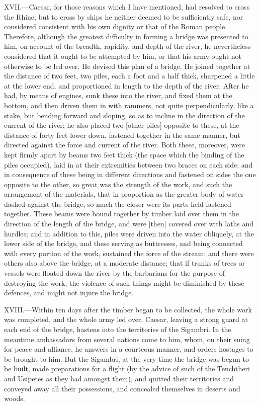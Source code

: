 XVII.—Caesar, for those reasons which I have mentioned, had resolved to
cross the Rhine; but to cross by ships he neither deemed to be
sufficiently safe, nor considered consistent with his own dignity or
that of the Roman people. Therefore, although the greatest difficulty in
forming a bridge was presented to him, on account of the breadth,
rapidity, and depth of the river, he nevertheless considered that it
ought to be attempted by him, or that his army ought not otherwise to be
led over. He devised this plan of a bridge. He joined together at the
distance of two feet, two piles, each a foot and a half thick, sharpened
a little at the lower end, and proportioned in length to the depth of
the river. After he had, by means of engines, sunk these into the river,
and fixed them at the bottom, and then driven them in with rammers, not
quite perpendicularly, like a stake, but bending forward and sloping, so
as to incline in the direction of the current of the river; he also
placed two [other piles] opposite to these, at the distance of forty
feet lower down, fastened together in the same manner, but directed
against the force and current of the river. Both these, moreover, were
kept firmly apart by beams two feet thick (the space which the binding
of the piles occupied), laid in at their extremities between two braces
on each side; and in consequence of these being in different directions
and fastened on sides the one opposite to the other, so great was the
strength of the work, and such the arrangement of the materials, that in
proportion as the greater body of water dashed against the bridge, so
much the closer were its parts held fastened together. These beams were
bound together by timber laid over them in the direction of the length
of the bridge, and were [then] covered over with laths and hurdles; and
in addition to this, piles were driven into the water obliquely, at the
lower side of the bridge, and these serving as buttresses, and being
connected with every portion of the work, sustained the force of the
stream: and there were others also above the bridge, at a moderate
distance; that if trunks of trees or vessels were floated down the river
by the barbarians for the purpose of destroying the work, the violence
of such things might be diminished by these defences, and might not
injure the bridge.

XVIII.—Within ten days after the timber began to be collected, the
whole work was completed, and the whole army led over. Caesar, leaving a
strong guard at each end of the bridge, hastens into the territories of
the Sigambri. In the meantime ambassadors from several nations come to
him, whom, on their suing for peace and alliance, he answers in a
courteous manner, and orders hostages to be brought to him. But the
Sigambri, at the very time the bridge was begun to be built, made
preparations for a flight (by the advice of such of the Tenchtheri and
Usipetes as they had amongst them), and quitted their territories and
conveyed away all their possessions, and concealed themselves in deserts
and woods.

